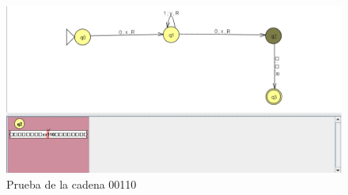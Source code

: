 \documentclass[12pt]{article}
\begin{document}
\begin{figure}[H]
\centering
\includegraphics[width=1\textwidth]{./inFiles/Figures/Cap4.png}
\caption{Prueba de la cadena 00110}
\end{figure}

\vspace{0.5cm}


\vspace{0.5cm}


\renewcommand{\refname}{\MakeUppercase{REFERENCIAS}}
%
%
\end{document}
